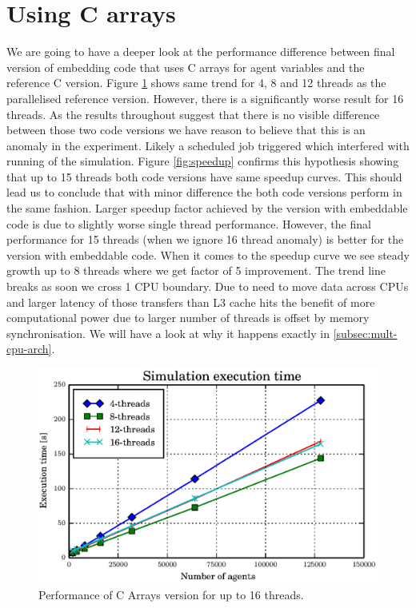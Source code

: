 \documentclass[12pt, a4paper]{report}
\begin{document}
\section{Using C arrays}\label{sec:array-use}
We are going to have a deeper look at the performance difference between final
version of embedding code that uses C arrays for agent variables and the reference
C version. Figure \ref{fig:dict-array-multi-16-perf} shows same trend for
4, 8 and 12 threads as the parallelised reference version. However, there is
a significantly worse result for 16 threads. As the results throughout suggest
that there is no visible difference between those two code versions we have
reason to believe that this is an anomaly in the experiment. Likely a scheduled
job triggered which interfered with running of the simulation. Figure \ref{fig:speedup}
confirms this hypothesis showing that up to 15 threads both code versions have
same speedup curves. This should lead us to conclude that with minor difference the
both code versions perform in the same fashion. Larger speedup factor achieved
by the version with embeddable code is due to slightly worse single thread performance.
However, the final performance for 15 threads (when we ignore 16 thread anomaly) is better
for the version with embeddable code. When it comes to the speedup curve we see steady
growth up to 8 threads where we get factor of 5 improvement. The trend line breaks as
soon we cross 1 CPU boundary. Due to need to move data across CPUs and larger latency
of those transfers than L3 cache hits the benefit of more computational power due to
larger number of threads is offset by memory synchronisation. We will have a look
at why it happens exactly in \ref{subsec:mult-cpu-arch}.

\begin{figure}[H]
  \begin{center}
    \includegraphics[width=\columnwidth]{graphs/dict-array-multi-16-perf.eps}
    \caption{Performance of C Arrays version for up to 16 threads.}
    \label{fig:dict-array-multi-16-perf}
  \end{center}
\end{figure}
\end{document}

